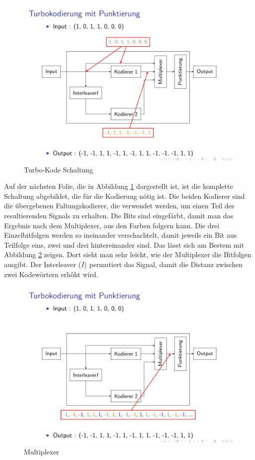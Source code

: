 \begin{figure}[!ht]
\centering
\includegraphics[width=\ScaleIfNeeded]{pictures/TurboEncodePunctured3}
\caption{Turbo-Kode Schaltung}
\label{pic:TurboEncode}
\end{figure}  

Auf der nächsten Folie, die in Abbildung \ref{pic:TurboEncode} dargestellt ist, ist die komplette Schaltung abgebildet, die für die Kodierung nötig ist. Die beiden Kodierer sind die übergebenen Faltungskodierer, die verwendet werden, um einen Teil des resultierenden Signals zu erhalten. Die Bits sind eingefärbt, damit man das Ergebnis nach dem Multiplexer, aus den Farben folgern kann. Die drei Einzelbitfolgen werden so ineinander verschachtelt, damit jeweils ein Bit aus Teilfolge eins, zwei und drei hintereinander sind. Das lässt sich am Bestem mit Abbildung \ref{pic:TurboEncodeMultiplexer} zeigen. Dort sieht man sehr leicht, wie der Multiplexer die Bitfolgen ausgibt. Der Interleaver ($I$) permutiert das Signal, damit die Distanz zwischen zwei Kodewörtern erhöht wird.

\begin{figure}[!ht]
\centering
\includegraphics[width=\ScaleIfNeeded]{pictures/TurboEncodePunctured4}
\caption{Multiplexer}
\label{pic:TurboEncodeMultiplexer}
\end{figure}  

